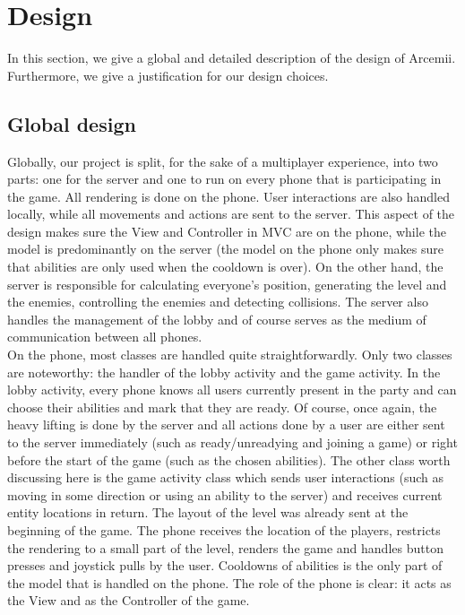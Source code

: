 \documentclass[../main.tex]{subfiles}
\begin{document}
\pagebreak

\section{Design}
In this section, we give a global and detailed description of the design of Arcemii. Furthermore, we give a justification for our design choices.

	\subsection{Global design}
	Globally, our project is split, for the sake of a multiplayer experience, into two parts: one for the server and one to run on every phone that is participating in the game. All rendering is done on the phone. User interactions are also handled locally, while all movements and actions are sent to the server. This aspect of the design makes sure the View and Controller in MVC are on the phone, while the model is predominantly on the server (the model on the phone only makes sure that abilities are only used when the cooldown is over). On the other hand, the server is responsible for calculating everyone's position, generating the level and the enemies, controlling the enemies and detecting collisions. The server also handles the management of the lobby and of course serves as the medium of communication between all phones. \\
		On the phone, most classes are handled quite straightforwardly. Only two classes are noteworthy: the handler of the lobby activity and the game activity. In the lobby activity, every phone knows all users currently present in the party and can choose their abilities and mark that they are ready. Of course, once again, the heavy lifting is done by the server and all actions done by a user are either sent to the server immediately (such as ready/unreadying and joining a game) or right before the start of the game (such as the chosen abilities). The other class worth discussing here is the game activity class which sends user interactions (such as moving in some direction or using an ability to the server) and receives current entity locations in return. The layout of the level was already sent at the beginning of the game. The phone receives the location of the players, restricts the rendering to a small part of the level, renders the game and handles button presses and joystick pulls by the user. Cooldowns of abilities is the only part of the model that is handled on the phone. The role of the phone is clear: it acts as the View and as the Controller of the game. \\
\end{document}
